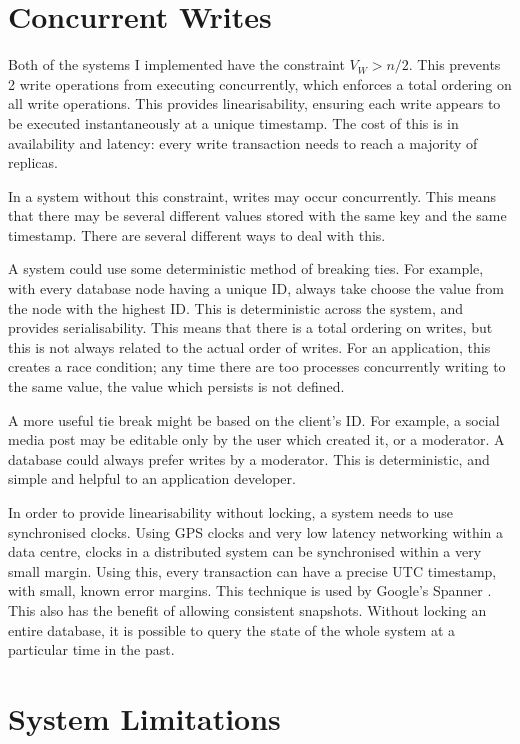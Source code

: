 \documentclass[12pt,a4paper,twoside,openright]{report}
\begin{document}
\section{Concurrent Writes}

Both of the systems I implemented have the constraint $V_W > n/2$. This prevents 2 write operations from executing concurrently, which enforces a total ordering on all write operations. This provides linearisability, ensuring each write appears to be executed instantaneously at a unique timestamp. The cost of this is in availability and latency: every write transaction needs to reach a majority of replicas.

In a system without this constraint, writes may occur concurrently. This means that there may be several different values stored with the same key and the same timestamp. There are several different ways to deal with this.

A system could use some deterministic method of breaking ties. For example, with every database node having a unique ID, always take choose the value from the node with the highest ID. This is deterministic across the system, and provides serialisability. This means that there is a total ordering on writes, but this is not always related to the actual order of writes. For an application, this creates a race condition; any time there are too processes concurrently writing to the same value, the value which persists is not defined.

A more useful tie break might be based on the client's ID. For example, a social media post may be editable only by the user which created it, or a moderator. A database could always prefer writes by a moderator. This is deterministic, and simple and helpful to an application developer.

In order to provide linearisability without locking, a system needs to use synchronised clocks. Using GPS clocks and very low latency networking within a data centre, clocks in a distributed system can be synchronised within a very small margin. Using this, every transaction can have a precise UTC timestamp, with small, known error margins. This technique is used by Google's Spanner \cite{45855}. This also has the benefit of allowing consistent snapshots. Without locking an entire database, it is possible to query the state of the whole system at a particular time in the past.

\section{System Limitations}
\end{document}
